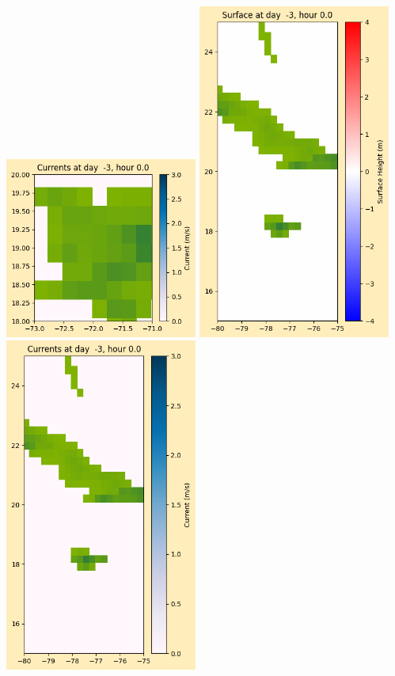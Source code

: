\documentclass[11pt]{article}
\begin{document}
\includegraphics[width=0.475\textwidth]{frame0000fig1006.png}
\vskip 10pt 
\includegraphics[width=0.475\textwidth]{frame0000fig1007.png}
\includegraphics[width=0.475\textwidth]{frame0000fig1008.png}
\end{document}

